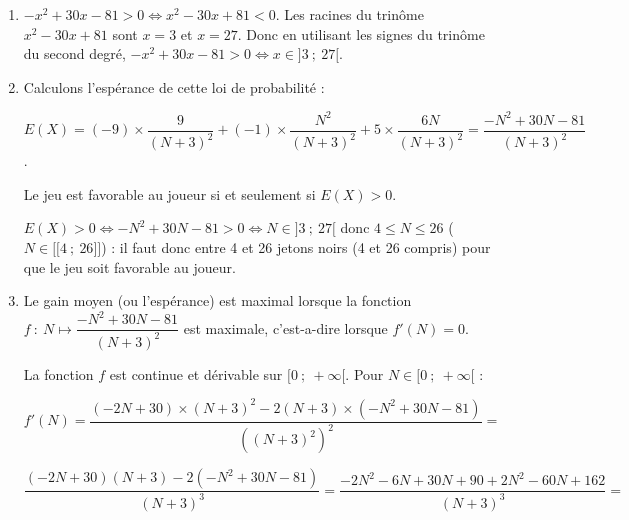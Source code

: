 \documentclass[10pt]{article}
\providecommand{\llbracket}{\lbrack\!\lbrack}
\providecommand{\rrbracket}{\rbrack\!\rbrack}
\begin{document}
\begin{enumerate}
\begin{enumerate}
	\begin{itemize}
		\item Pour perdre 9 euros, il faut tirer deux jetons blancs : $P(X=-9)=\left(\dfrac{3}{N+3}\right)^2=\dfrac{9}{(N + 3)^2}$
		\item Pour perdre un euro il faut tirer deux jetons noirs : $P(X=-1)=\left(\dfrac{N}{N+3}\right)^2=\dfrac{N^2}{(N + 3)^2}$
		\item pour gagner cinq euros, il faut tirer un jeton de chaque couleur (B + N ou N + B) :\\ $P(X=5)=2\times \dfrac{3}{N + 3} \times \dfrac{N}{N + 3}=\dfrac{6N}{(N + 3)^2}$
	\end{itemize}
La loi de probabilités est donc :
\begin{center}
\begin{tabular}{|l|c|c|c|}\hline
$X=x_i$&$- 9$&$-1$&5 \\ \hline
$P(X=x_i)$&$\dfrac{9}{(N+3)^2}$&$\dfrac{N^2}{(N+3)^2}$&$\dfrac{6N}{(N+3)^2}$ \\ \hline
\end{tabular}
\end{center}
\item $-x^2 + 30x - 81 > 0 \iff x^2-30x+81<0$. Les racines du trinôme $x^2-30x+81$ sont $x=3$ et $x=27$. Donc en utilisant les signes du trinôme du second degré, $-x^2+30x-81>0 \iff x\in ]3~;~27[$.
\item Calculons l'espérance de cette loi de probabilité :

 $E(X)=(-9)\times \dfrac{9}{(N+3)^2} + (-1)\times \dfrac{N^2}{(N+3)^2}+5 \times \dfrac{6N}{(N+3)^2}=\dfrac{-N^2+30N-81}{(N+3)^2}$.

Le jeu est favorable au joueur si et seulement si $E(X)>0$.

$E(X)>0 \iff -N^2+30N-81>0 \iff N\in ]3~;~27[$ donc $4\leqslant N \leqslant 26$ ($N \in \llbracket4~;~26 \rrbracket$) : il faut donc entre 4 et 26 jetons noirs (4 et 26 compris) pour que le jeu soit favorable au joueur.
\item Le gain moyen (ou l'espérance) est maximal lorsque la fonction $f~:~N\mapsto \dfrac{-N^2 + 30N - 81}{(N + 3)^2}$ est maximale, c'est-a-dire lorsque $f'(N) = 0$.

La fonction $f$ est continue et dérivable sur $[0~;~+\infty[$. Pour $N\in [0~;~+\infty[$ :

 $f'(N)=\dfrac{(-2N + 30)\times (N + 3)^2-2(N + 3)\times (-N^2 + 30N - 81)}{\left((N+3)^2\right)^2}=$

$\dfrac{(-2N + 30)(N + 3)-2(-N^2 + 30N - 81)}{(N+3)^3}
 =\dfrac{-2N^2 - 6N + 30N + 90 + 2N^2 - 60N + 162}{(N + 3)^3}=$


\end{enumerate}
\end{enumerate}
\end{document}
